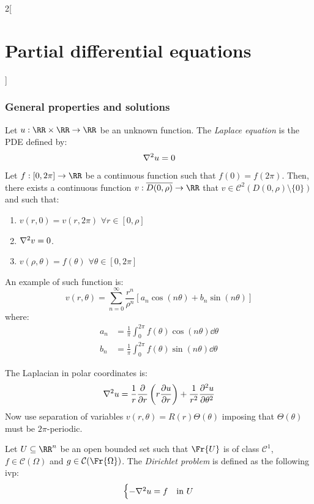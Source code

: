 \documentclass[../../../main_math.tex]{subfiles}
\begin{document}
\begin{multicols}{2}[\section{Partial differential equations}]
  \subsubsection{General properties and solutions}
  \begin{definition}
    Let $u:\RR\times\RR\rightarrow\RR$ be an unknown function. The \emph{Laplace equation} is the PDE defined by: $$\laplacian u=0$$
  \end{definition}
  \begin{proposition}
    Let $f:[0,2\pi]\rightarrow\RR$ be a continuous function such that $f(0)=f(2\pi)$. Then, there exists a continuous function $v:\overline{D(0,\rho)}\rightarrow\RR$ that $v\in\mathcal{C}^2(D(0,\rho)\setminus\{0\})$ and such that:
    \begin{enumerate}
      \item $v(r,0)=v(r,2\pi)$ $\forall r\in[0,\rho]$
      \item $\laplacian v=0$.
      \item $v(\rho,\theta)=f(\theta)$ $\forall\theta\in[0,2\pi]$
    \end{enumerate}
    An example of such function is:
    $$v(r,\theta)=\sum_{n=0}^\infty \frac{r^n}{\rho^n}\left[a_n\cos\left(n\theta\right)+ b_n\sin\left(n\theta\right)\right]$$ where:
    \begin{align*}
      a_n & =\frac{1}{\pi}\int_{0}^{2\pi} f(\theta)\cos\left(n\theta\right)\dd{\theta} \\
      b_n & =\frac{1}{\pi}\int_{0}^{2\pi} f(\theta)\sin\left(n\theta\right)\dd{\theta}
    \end{align*}
  \end{proposition}
  \begin{sproof}
    The Laplacian in polar coordinates is: $$\laplacian u=\frac{1}{r}\pdv{}{r}\left(r\pdv{u}{r}\right)+\frac{1}{r^2}\pdv[2]{u}{\theta}$$ Now use separation of variables $v(r,\theta)=R(r)\Theta(\theta)$ imposing that $\Theta(\theta)$ must be $2\pi$-periodic.
  \end{sproof}
  \begin{definition}
    Let $U\subseteq \RR^n$ be an open bounded set such that $\Fr{U}$ is of class $\mathcal{C}^1$, $f\in\mathcal{C}(\Omega)$ and $g\in\mathcal{C}(\Fr{\Omega})$. The \emph{Dirichlet problem} is defined as the following ivp:
    \begin{equation}\label{PDE:dirichlet}
      \begin{cases}
        -\laplacian{u} = f & \text{in $U$}      \\

\end{cases}
\end{equation}
\end{definition}
\end{multicols}
\end{document}
